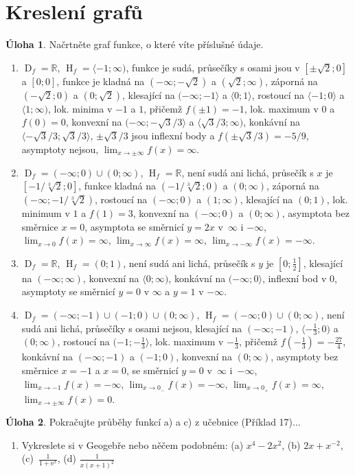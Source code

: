 \documentclass[12pt,a4paper]{article}
\DeclareMathOperator{\DO}{D}
\DeclareMathOperator{\HO}{H}
\def\ee{\mathrm{e}}
\def\R{\mathbb R}
\theoremstyle{definition}
\newtheorem{uloha}{Úloha}
\begin{document}
\section*{Kreslení grafů}



\begin{uloha}
Načrtněte graf funkce, o které víte příslušné údaje.
\begin{enumerate}[label={(\alph*)}]
	\parskip\bigskipamount
	\item $\DO_f = \R$, $\HO_f = \langle-1; \infty)$, funkce je sudá, průsečíky s osami jsou v $[\pm \sqrt2; 0]$ a $[0; 0]$, funkce je kladná na $(-\infty; -\sqrt2)$ a $(\sqrt2; \infty)$, záporná na $(-\sqrt2; 0)$ a $(0; \sqrt2)$, klesající na $(-\infty; -1\rangle$ a $\langle0; 1\rangle$, rostoucí na $\langle-1; 0\rangle$ a $\langle1; \infty)$, lok. minima v $-1$ a $1$, přičemž $f(\pm1) = -1$, lok. maximum v $0$ a $f(0) = 0$, konvexní na $(-\infty; -\sqrt3 /3\rangle$ a $\langle\sqrt3 /3; \infty)$, konkávní na  $\langle-\sqrt3 /3; \sqrt3 /3\rangle$, $\pm \sqrt3/3$ jsou inflexní body a $f(\pm\sqrt3 /3) = -5/9$, asymptoty nejsou, $\lim_{x \to \pm \infty} f(x) = \infty$.
	
	\item $\DO_f = (-\infty;0)\cup(0;\infty)$, $\HO_f = \R$, není sudá ani lichá, průsečík s $x$ je $[-1/\sqrt[3]2; 0]$, funkce kladná na $(-1/\sqrt[3]2; 0)$ a $(0; \infty)$, záporná na $(-\infty; -1/\sqrt[3]2)$, rostoucí na $(-\infty; 0)$ a $(1; \infty)$, klesající na $(0; 1)$, lok. minimum v $1$ a $f(1) = 3$, konvexní na $(-\infty; 0)$ a $(0; \infty)$, asymptota bez směrnice $x = 0$, asymptota se směrnicí $y = 2x$ v~$\infty$ i $-\infty$, $\lim_{x \to 0}f(x) = \infty$, $\lim_{x \to \infty} f(x) = \infty$, $\lim_{x \to -\infty} f(x) = -\infty$.
	
	
	\item $\DO_f = \R$, $\HO_f = (0; 1)$, není sudá ani lichá, průsečík s $y$ je $[0; \frac12]$, klesající na $(-\infty; \infty)$, konvexní na $\langle0; \infty)$, konkávní na $(-\infty; 0\rangle$, inflexní bod v $0$, asymptoty se směrnicí $y = 0$ v $\infty$ a $y = 1$ v $-\infty$.

	\item $\DO_f = (-\infty; -1) \cup (-1; 0) \cup (0; \infty)$, $\HO_f = (-\infty; 0) \cup (0; \infty)$, není sudá ani lichá, průsečíky s osami nejsou, klesající na $(-\infty; -1)$, $\langle -\frac13; 0)$ a $(0; \infty)$, rostoucí na $(-1; -\frac13\rangle$, lok. maximum v $-\frac13$, přičemž $f(-\frac13) = -\frac{27}{4}$, konkávní na $(-\infty; -1)$ a $(-1; 0)$, konvexní na $(0; \infty)$, asymptoty bez směrnice $x = -1$ a $x = 0$, se směrnicí $y = 0$ v~$\infty$ i~$-\infty$, $\lim_{x \to -1}f(x) = -\infty$, $\lim_{x \to 0_-} f(x) = -\infty$, $\lim_{x \to 0_+} f(x) = \infty$, $\lim_{x \to \pm \infty} f(x) = 0$.
\end{enumerate}
\end{uloha}

\begin{uloha}
Pokračujte průběhy funkcí a) a c) z učebnice (Příklad 17)...
\end{uloha}

\newpage

\begin{enumerate}
	\everymath{\displaystyle}
	\item Vykreslete si v Geogebře nebo něčem podobném: (a) $x^4-2x^2$, (b) $2x + x^{-2}$, (c)~$\frac{1}{1+\ee^x}$, (d) $\frac{1}{x(x+1)^2}$
\end{enumerate}
\end{document}
